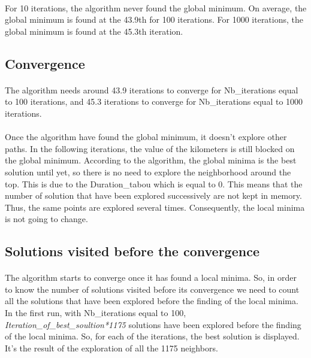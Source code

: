 \documentclass[12pt,oneside,a4paper]{article}
\begin{document}
\paragraph{}
    For 10 iterations, the algorithm never found the global minimum. On average, the global minimum is found at the 43.9th
    for 100 iterations. For 1000 iterations, the global minimum is found at the 45.3th iteration.

\subsection{Convergence}
\paragraph{}
    The algorithm needs around 43.9 iterations to converge for Nb\_iterations equal to 100 iterations, and 45.3 iterations to converge for Nb\_iterations equal to 1000 iterations. 
\paragraph{}
    Once the algorithm have found the global minimum, it doesn't explore other paths. In the following iterations, the value of the kilometers is still blocked on the global minimum. 
    According to the algorithm, the global minima is the best solution until yet, so there is no need to explore the neighborhood around the top.  
    This is due to the Duration\_tabou which is equal to 0. This means that the number of solution that have been explored successively are not kept in memory. 
    Thus, the same points are explored several times. Consequently, the local minima is not going to change.

\newpage
\subsection{Solutions visited before the convergence}
\paragraph{}
    The algorithm starts to converge once it has found a local minima.
    So, in order to know the number of solutions visited before its convergence we need to count all the solutions 
    that have been explored before the finding of the local minima. 
    In the first run, with Nb\_iterations equal to 100, \textit{Iteration\_of\_best\_soultion*1175} solutions have been explored before the finding of the local minima. 
    So, for each of the iterations, the best solution is displayed. It’s the result of the exploration of all the 1175 neighbors.
\end{document}
